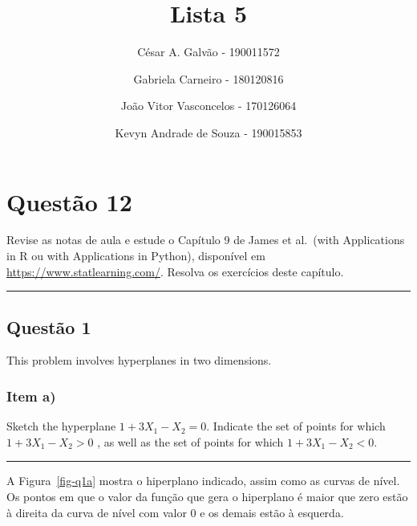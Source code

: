 \documentclass[
  a4paperpaper,
]{article}
\title{Lista 5}
\author{César A. Galvão - 190011572 \and Gabriela Carneiro -
180120816 \and João Vitor Vasconcelos - 170126064 \and Kevyn Andrade de
Souza - 190015853}
\date{}
\renewcommand*\contentsname{Índice}
\newcommand\contentsname{Índice}
\begin{document}
\maketitle

\renewcommand*\contentsname{Índice}
{
\hypersetup{linkcolor=}
\setcounter{tocdepth}{2}
\tableofcontents
}
\newpage{}

\section{Questão 12}\label{questuxe3o-12}

Revise as notas de aula e estude o Capítulo 9 de James et al.~(with
Applications in R ou with Applications in Python), disponível em
\url{https://www.statlearning.com/}. Resolva os exercícios deste
capítulo.

\begin{center}\rule{0.5\linewidth}{0.5pt}\end{center}

\subsection{Questão 1}\label{questuxe3o-1}

This problem involves hyperplanes in two dimensions.

\subsubsection{Item a)}\label{item-a}

Sketch the hyperplane \(1 + 3X_1 - X_2 = 0\). Indicate the set of points
for which \(1 + 3X_1 - X_2 > 0\) , as well as the set of points for
which \(1 + 3X_1 - X_2 < 0\).

\begin{center}\rule{0.5\linewidth}{0.5pt}\end{center}

A Figura~\ref{fig-q1a} mostra o hiperplano indicado, assim como as
curvas de nível. Os pontos em que o valor da função que gera o
hiperplano é maior que zero estão à direita da curva de nível com valor
0 e os demais estão à esquerda.
\end{document}
